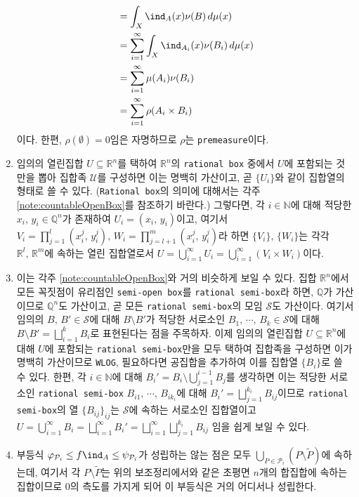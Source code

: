 \begin{enumerate}[label = \textsf{\textbf{\arabic*}}]
\begin{align*}
        &=\int_X\ind_A(x)\nu(B)\,d\mu(x)\\
        &=\sum_{i=1}^\infty\int_X\ind_{A_i}(x)\nu(B_i)\,d\mu(x)\\
        &=\sum_{i=1}^\infty\mu(A_i)\nu(B_i)\\
        &=\sum_{i=1}^\infty\rho(A_i\times B_i)
    \end{align*}
    이다. 한편, $\rho(\emptyset)=0$임은 자명하므로 $\rho$는 \texttt{premeasure}이다.
    \item 임의의 열린집합 $U\subseteq\mathbb{R}^n$를 택하여 $\mathbb{R}^n$의 \texttt{rational box} 중에서 $U$에 포함되는 것만을 뽑아 집합족 $\mathcal{U}$를 구성하면 이는 명백히 가산이고, 곧 $\{U_i\}$와 같이 집합열의 형태로 쓸 수 있다. (\texttt{Rational box}의 의미에 대해서는 각주 \ref{note:countableOpenBox}를 참조하기 바란다.) 그렇다면, 각 $i\in\mathbb{N}$에 대해 적당한 $x_i,\,y_i\in\mathbb{Q}^n$가 존재하여 $U_i=(x_i,\,y_i)$이고, 여기서 $V_i=\prod_{j=1}^l(x_i^j,\,y_i^j),\,W_i=\prod_{j=l+1}^m(x_i^j,\,y_i^j)$라 하면 $\{V_i\},\,\{W_i\}$는 각각 $\mathbb{R}^l,\,\mathbb{R}^m$에 속하는 열린 집합열로서 $U=\bigcup_{i=1}^\infty U_i=\bigcup_{i=1}^\infty(V_i\times W_i)$이다.
    \item 이는 각주 \ref{note:countableOpenBox}와 거의 비슷하게 보일 수 있다. 집합 $\mathbb{R}^n$에서 모든 꼭짓점이 유리점인 \texttt{semi-open box}를 \texttt{rational semi-box}라 하면, $\mathbb{Q}$가 가산이므로 $\mathbb{Q}^n$도 가산이고, 곧 모든 \texttt{rational semi-box}의 모임 $\mathcal{S}$도 가산이다. 여기서 임의의 $B,\,B'\in\mathcal{S}$에 대해 $B\setminus B'$가 적당한 서로소인 $B_1,\,\cdots,\,B_k\in\mathcal{S}$에 대해 $B\setminus B'=\bigsqcup_{i=1}^kB_i$로 표현된다는 점을 주목하자. 이제 임의의 열린집합 $U\subseteq\mathbb{R}^n$에 대해 $U$에 포함되는 \texttt{rational semi-box}만을 모두 택하여 집합족을 구성하면 이가 명백히 가산이므로 \texttt{WLOG}, 필요하다면 공집합을 추가하여 이를 집합열 $\{B_i\}$로 쓸 수 있다. 한편, 각 $i\in\mathbb{N}$에 대해 $B_i'=B_i\setminus\bigcup_{j=1}^{i-1}B_j$를 생각하면 이는 적당한 서로소인 \texttt{rational semi-box} $B_{i1},\,\cdots,\,B_{ik_i}$에 대해 $B_i'=\bigsqcup_{j=1}^{k_i}B_{ij}$이므로 \texttt{rational semi-box}의 열 $\{B_{ij}\}_{ij}$는 $\mathcal{S}$에 속하는 서로소인 집합열이고 $U=\bigcup_{i=1}^\infty B_i=\bigsqcup_{i=1}^\infty B_i'=\bigsqcup_{i=1}^\infty\bigsqcup_{j=1}^{k_i}B_{ij}$ 임을 쉽게 보일 수 있다.
    \item 부등식 $\varphi_{\mathcal{P}_i}\leq f\ind_A\leq\psi_{\mathcal{P}_i}$가 성립하는 않는 점은 모두 $\bigcup_{P\in\mathcal{P}_i}(P\setminus\widetilde{P})$에 속하는데, 여기서 각 $P\setminus\widetilde{P}$는 위의 보조정리에서와 같은 초평면 $n$개의 합집합에 속하는 집합이므로 0의 측도를 가지게 되어 이 부등식은 거의 어디서나 성립한다.

\end{enumerate}
